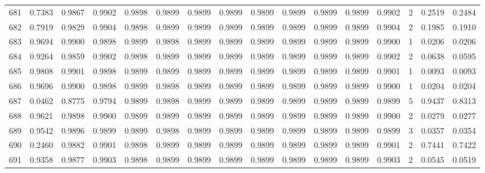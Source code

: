 \begin{tabular}{lrrrrrrrrrrrrrrr}
681 &      0.7383 &  0.9867 &  0.9902 &  0.9898 &  0.9899 &  0.9899 &  0.9899 &  0.9899 &  0.9899 &  0.9899 &   0.9899 &     0.9902 &      2 &                    0.2519 &                     0.2484 \\
682 &      0.7919 &  0.9829 &  0.9904 &  0.9898 &  0.9899 &  0.9899 &  0.9899 &  0.9899 &  0.9899 &  0.9899 &   0.9899 &     0.9904 &      2 &                    0.1985 &                     0.1910 \\
683 &      0.9694 &  0.9900 &  0.9898 &  0.9899 &  0.9898 &  0.9899 &  0.9899 &  0.9899 &  0.9899 &  0.9899 &   0.9899 &     0.9900 &      1 &                    0.0206 &                     0.0206 \\
684 &      0.9264 &  0.9859 &  0.9902 &  0.9898 &  0.9899 &  0.9899 &  0.9899 &  0.9899 &  0.9899 &  0.9899 &   0.9899 &     0.9902 &      2 &                    0.0638 &                     0.0595 \\
685 &      0.9808 &  0.9901 &  0.9898 &  0.9899 &  0.9899 &  0.9899 &  0.9899 &  0.9899 &  0.9899 &  0.9899 &   0.9899 &     0.9901 &      1 &                    0.0093 &                     0.0093 \\
686 &      0.9696 &  0.9900 &  0.9898 &  0.9899 &  0.9898 &  0.9899 &  0.9899 &  0.9899 &  0.9899 &  0.9899 &   0.9899 &     0.9900 &      1 &                    0.0204 &                     0.0204 \\
687 &      0.0462 &  0.8775 &  0.9794 &  0.9899 &  0.9898 &  0.9899 &  0.9899 &  0.9899 &  0.9899 &  0.9899 &   0.9899 &     0.9899 &      5 &                    0.9437 &                     0.8313 \\
688 &      0.9621 &  0.9898 &  0.9900 &  0.9899 &  0.9899 &  0.9899 &  0.9899 &  0.9899 &  0.9899 &  0.9899 &   0.9899 &     0.9900 &      2 &                    0.0279 &                     0.0277 \\
689 &      0.9542 &  0.9896 &  0.9899 &  0.9899 &  0.9898 &  0.9899 &  0.9899 &  0.9899 &  0.9899 &  0.9899 &   0.9899 &     0.9899 &      3 &                    0.0357 &                     0.0354 \\
690 &      0.2460 &  0.9882 &  0.9901 &  0.9898 &  0.9899 &  0.9899 &  0.9899 &  0.9899 &  0.9899 &  0.9899 &   0.9899 &     0.9901 &      2 &                    0.7441 &                     0.7422 \\
691 &      0.9358 &  0.9877 &  0.9903 &  0.9898 &  0.9899 &  0.9899 &  0.9899 &  0.9899 &  0.9899 &  0.9899 &   0.9899 &     0.9903 &      2 &                    0.0545 &                     0.0519 \\

\end{tabular}
